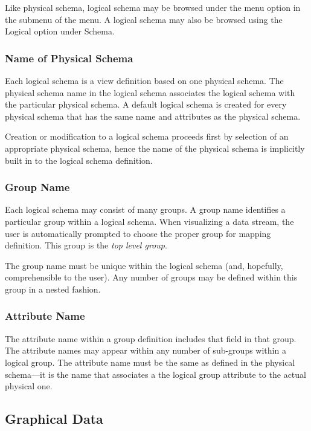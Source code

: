 Like physical schema, logical schema may be browsed under the 
menu option in the  submenu of the  menu.  A logical
schema may also be browsed using the Logical option under Schema.

\subsubsection{Name of Physical Schema}

Each logical schema is a view definition based on one physical schema. The
physical schema name in the logical schema associates the logical schema with
the particular physical schema. A default logical schema is created for every
physical schema that has the same name and attributes as the physical schema.

Creation or modification to a logical schema proceeds first by selection of an
appropriate physical schema, hence the name of the physical schema is implicitly
built in to the logical schema definition.

\subsubsection{Group Name}

Each logical schema may consist of many groups. A group name identifies a
particular group within a logical schema. When visualizing a data stream, the
user is automatically prompted to choose the proper group for mapping
definition. This group is the {\em top level group}.

The group name must be unique within the logical schema (and, hopefully,
comprehensible to the user). Any number of groups may be defined within this
group in a nested fashion.

\subsubsection{Attribute Name}

The attribute name within a group definition includes that field in that
group. The attribute names may appear within any number of sub-groups within a
logical group. The attribute name must be the same as defined in the physical
schema---it is the name that associates a the logical group attribute to the
actual physical one.


\subsection{Graphical Data}

